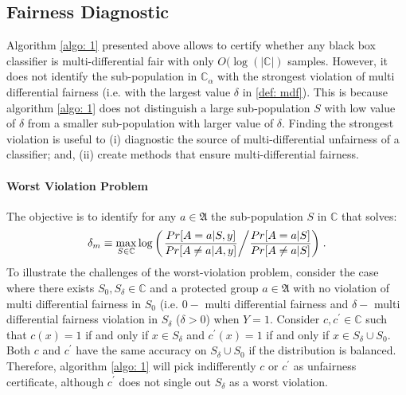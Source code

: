 \documentclass{article}
\begin{document}
\subsection{Fairness Diagnostic}
Algorithm \ref{algo: 1} presented above allows to certify whether any black box classifier is multi-differential fair with only $O(\log(|\mathbb{C}|)$ samples. However, it does not identify the sub-population in $\mathbb{C}_{\alpha}$ with the strongest violation of multi differential fairness (i.e. with the largest value $\delta$ in \ref{def: mdf}). This is because algorithm \ref{algo: 1} does not distinguish a large sub-population $S$ with low value of $\delta$ from a smaller sub-population with larger value of $\delta$. Finding the strongest violation is useful to (i) diagnostic the source of multi-differential unfairness of a classifier; and, (ii) create methods that ensure multi-differential fairness. 

\paragraph{Worst Violation Problem}
The objective is to identify for any $a\in \mathfrak{A}$ the sub-population $S$ in $\mathbb{C}$ that solves:
\begin{equation}
\label{eq: wvio}
    \delta_{m} \equiv \max_{S\in \mathbb{C}}\log\left(\left.\frac{Pr[A=a|S, y]}{Pr[A\neq a|A, y]}\middle/\frac{Pr[A=a|S]}{Pr[A\neq a|S]}\right)\right. .
\end{equation}
To illustrate the challenges of the worst-violation problem, consider the case where there exists $S_{0}, S_{\delta}\in \mathbb{C}$ and a protected group $a\in \mathfrak{A}$ with no violation of multi differential fairness in $S_{0}$ (i.e. $0-$ multi differential fairness and $\delta-$ multi differential fairness violation in $S_{\delta}$ ($\delta >0$) when $Y=1$.  Consider $c, c^{'}\in \mathbb{C}$ such that $c(x)=1$ if and only if $x\in S_{\delta}$ and $c^{'}(x)=1$ if and only if $x\in S_{\delta}\cup S_{0}$. Both $c$ and $c^{'}$ have the same accuracy on $S_{\delta}\cup S_{0}$ if the distribution is balanced. Therefore, algorithm \ref{algo: 1} will pick indifferently $c$ or $c^{'}$ as unfairness certificate, although $c^{'}$ does not single out $S_{\delta}$ as a worst violation. 
\end{document}
